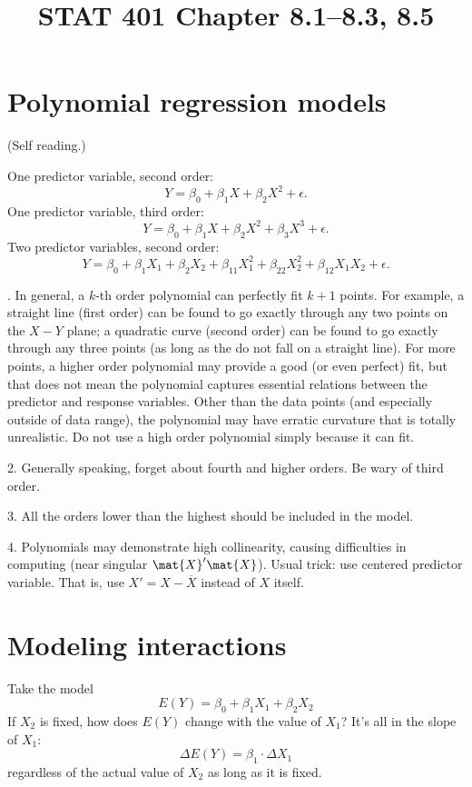 \documentclass[12pt]{article}
\begin{document}
\title{STAT 401 Chapter 8.1--8.3, 8.5}
\maketitle

\section{Polynomial regression models}

(Self reading.)

One predictor variable, second order:
\[
Y = \beta_0 + \beta_1 X + \beta_2 X^2 + \epsilon
.
\]
One predictor variable, third order:
\[
Y = \beta_0 + \beta_1 X + \beta_2 X^2 + \beta_3 X^3 + \epsilon
.
\]
Two predictor variables, second order:
\[
Y = \beta_0 + \beta_1 X_1 + \beta_2 X_2 + \beta_{11} X_1^2
    + \beta_{22} X_2^2 + \beta_{12} X_1X_2 + \epsilon
.
\]


. In general, a $k$-th order polynomial can perfectly fit $k+1$ points.
For example, a straight line (first order) can be found to go exactly
through any two points on the $X-Y$ plane;
a quadratic curve (second order) can be found to go
exactly through any three points
(as long as the do not fall on a straight line).
For more points, a higher order polynomial may provide a good (or even
perfect) fit, but that does not mean the polynomial captures essential
relations between the predictor and response variables.
Other than the data points (and especially outside of data range),
the polynomial may have erratic curvature that is totally unrealistic.
Do not use a high order polynomial simply because it can fit.

2. Generally speaking,
forget about fourth and higher orders. Be wary of third order.

3. All the orders lower than the highest should be included
in the model.

4. Polynomials may demonstrate high collinearity, causing
difficulties in computing (near singular $\mat{X}'\mat{X}$).
Usual trick: use centered predictor variable.
That is,
use $X' = X - \overline{X}$ instead of $X$ itself.


\section{Modeling interactions}

Take the model
\[
E(Y) = \beta_0 + \beta_1 X_1 + \beta_2 X_2
\]
If $X_2$ is fixed, how does $E(Y)$ change with the value of $X_1$?
It's all in the slope of $X_1$:
\[
\Delta E(Y) = \beta_1 \cdot \Delta X_1
\]
regardless of the actual value of $X_2$ as long as it is fixed.
\end{document}
